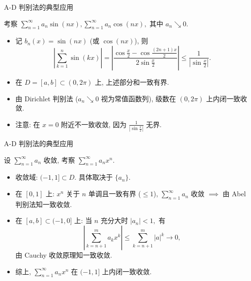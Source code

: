 
\begin{frame}{A-D 判别法的典型应用}

\begin{eg}[三角函数级数]
考察 $\sum_{n=1}^\infty a_n \sin(nx), \sum_{n=1}^\infty a_n \cos(nx),$ 其中 $a_n \searrow 0.$
\end{eg}

\pause

\begin{itemize}[<+->]
\item 记 $b_n(x) = \sin(nx)$ (或 $\cos(nx)$), 则
  \[\left\lvert \sum_{k=1}^n \sin(kx) \right\rvert = \left\lvert \frac{\cos\frac{x}{2} - \cos\frac{(2n+1)x}{2}}{2\sin\frac{x}{2}} \right\rvert \leqslant \frac{1}{|\sin\frac{x}{2}|}.\]
\item 在 $D = [a, b] \subset (0, 2\pi)$ 上, 上述部分和一致有界.
\item 由 Dirichlet 判别法 ($a_n \searrow 0$ 视为常值函数列), 级数在 $(0, 2\pi)$ 上内闭一致收敛.
\item 注意: 在 $x = 0$ 附近不一致收敛, 因为 $\frac{1}{|\sin\frac{x}{2}|}$ 无界.
\end{itemize}

\end{frame}


\begin{frame}{A-D 判别法的典型应用}

\begin{eg}
设 $\sum_{n=1}^\infty a_n$ 收敛, 考察 $\sum_{n=1}^\infty a_n x^n.$
\end{eg}

\pause

\begin{itemize}[<+->]
\item 收敛域: $(-1, 1] \subset D.$ 具体取决于 $\{a_n\}.$
\item 在 $[0, 1]$ 上: $x^n$ 关于 $n$ 单调且一致有界 ($\leqslant 1$), $\sum_{n=1}^\infty a_n$ 收敛 $\implies$ 由 Abel 判别法知一致收敛.
\item 在 $[a, b] \subset (-1, 0]$ 上: 当 $n$ 充分大时 $|a_n| < 1,$ 有
  \[\left\lvert \sum_{k=n+1}^m a_k x^k \right\rvert \leqslant \sum_{k=n+1}^m |a|^k \to 0,\]
  由 Cauchy 收敛原理知一致收敛.
\item 综上, $\sum_{n=1}^\infty a_n x^n$ 在 $(-1, 1]$ 上内闭一致收敛.
\end{itemize}

\end{frame}


